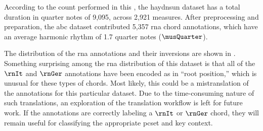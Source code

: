 
According to the count performed in this \thesisdiss{}, the
\gls{haydnsun} dataset has a total duration in quarter notes
of 9,095, across 2,921 measures. After preprocessing and
preparation, the \gls{abc} dataset contributed 5,357
\gls{rna} chord annotations, which have an average harmonic
rhythm of 1.7 quarter notes ($\musQuarter$).

The distribution of the \gls{rna} annotations and their
inversions are shown in .
Something surprising among the \gls{rna} distribution of
this dataset is that all of the $\rnIt$ and $\rnGer$
annotations have been encoded as in ``root position,'' which
is unusual for these types of chords. Most likely, this
could be a mistranslation of the annotations for this
particular dataset. Due to the time-consuming nature of such
translations, an exploration of the translation workflow is
left for future work. If the annotations are correctly
labeling a $\rnIt$ or $\rnGer$ chord, they will remain
useful for classifying the appropriate \gls{pcset} and key
context.




